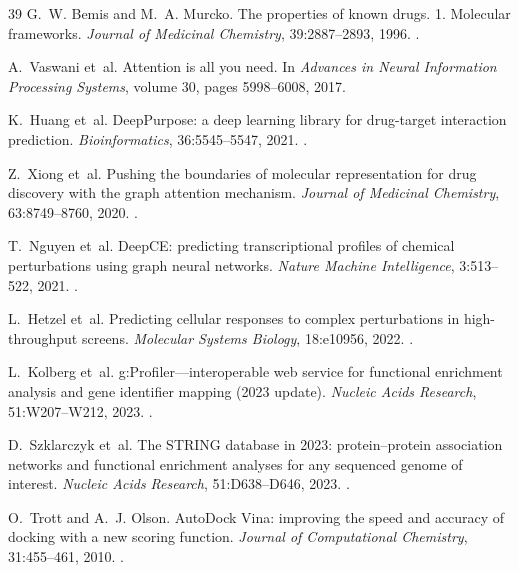 \begin{thebibliography}{39}
G.~W. Bemis and M.~A. Murcko.
\newblock The properties of known drugs. 1. Molecular frameworks.
\newblock \emph{Journal of Medicinal Chemistry}, 39:2887--2893, 1996.
\newblock {}.

A.~Vaswani et~al.
\newblock Attention is all you need.
\newblock In \emph{Advances in Neural Information Processing Systems}, volume 30, pages 5998--6008, 2017.

K.~Huang et~al.
\newblock DeepPurpose: a deep learning library for drug-target interaction prediction.
\newblock \emph{Bioinformatics}, 36:5545--5547, 2021.
\newblock {}.

Z.~Xiong et~al.
\newblock Pushing the boundaries of molecular representation for drug discovery with the graph attention mechanism.
\newblock \emph{Journal of Medicinal Chemistry}, 63:8749--8760, 2020.
\newblock {}.

T.~Nguyen et~al.
\newblock DeepCE: predicting transcriptional profiles of chemical perturbations using graph neural networks.
\newblock \emph{Nature Machine Intelligence}, 3:513--522, 2021.
\newblock {}.

L.~Hetzel et~al.
\newblock Predicting cellular responses to complex perturbations in high-throughput screens.
\newblock \emph{Molecular Systems Biology}, 18:e10956, 2022.
\newblock {}.

L.~Kolberg et~al.
\newblock g:Profiler---interoperable web service for functional enrichment analysis and gene identifier mapping (2023 update).
\newblock \emph{Nucleic Acids Research}, 51:W207--W212, 2023.
\newblock {}.

D.~Szklarczyk et~al.
\newblock The STRING database in 2023: protein--protein association networks and functional enrichment analyses for any sequenced genome of interest.
\newblock \emph{Nucleic Acids Research}, 51:D638--D646, 2023.
\newblock {}.

O.~Trott and A.~J. Olson.
\newblock AutoDock Vina: improving the speed and accuracy of docking with a new scoring function.
\newblock \emph{Journal of Computational Chemistry}, 31:455--461, 2010.
\newblock {}.


\end{thebibliography}
